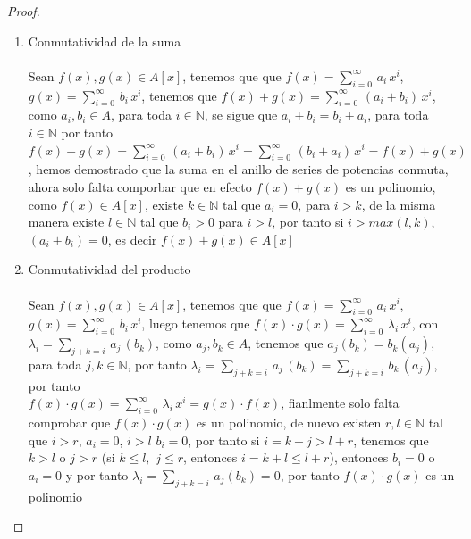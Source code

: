\documentclass[11pt,letterpaper]{article}
\newcommand{\N}{\mathbb{N}}
\begin{document}
\begin{proof}\,\\
    \begin{enumerate}
        \item Conmutatividad de la suma\,\\
        \,\\
        Sean $f(x),g(x)\in A[x]$, tenemos que que $f(x)=\sum_{i=0}^{\infty}\,a_i\,x^i$, $g(x)=\sum_{i=0}^{\infty}\,b_i\,x^i$, tenemos que
        $f(x)+g(x)=\sum_{i=0}^{\infty}\,(a_i+b_i)\,x^i$, como $a_i,b_i\in A$, para toda $i\in \N$, se sigue que $a_i+b_i=b_i+a_i$, para toda $i\in \N$
        por tanto $f(x)+g(x)=\sum_{i=0}^{\infty}\,(a_i+b_i)\,x^i=\sum_{i=0}^{\infty}\,(b_i+a_i)\,x^i=f(x)+g(x)$, hemos demostrado que la suma en el anillo de series de potencias
        conmuta, ahora solo falta comporbar que en efecto $f(x)+g(x)$ es un polinomio, como $f(x)\in A[x]$, existe $k\in \N$ tal que
        $a_i=0$, para $i>k$, de la misma manera existe $l\in \N $ tal que $b_i>0$ para $i>l$, por tanto si $i>max(l,k)$, $(a_i+b_i)=0$, es decir $f(x)+g(x)\in A[x]$
        \,\\
        \item Conmutatividad del producto\,\\
        \,\\
        Sean $f(x),g(x)\in A[x]$, tenemos que que $f(x)=\sum_{i=0}^{\infty}\,a_i\,x^i$, $g(x)=\sum_{i=0}^{\infty}\,b_i\,x^i$, luego tenemos que 
        $f(x)\cdot g(x)=\sum_{i=0}^\infty\,\lambda_i\,x^i$, con $\lambda_i=\sum_{j+k=i}\,a_j\,(b_k)$, como $a_j,b_k\in A$, tenemos que $a_j(b_k)=b_k(a_j)$, para toda $j,k\in \N$, 
        por tanto $\lambda_i=\sum_{j+k=i}\,a_j\,(b_k)=\sum_{j+k=i}\,b_k\,(a_j)$, por tanto\\ $f(x)\cdot g(x)=\sum_{i=0}^\infty\,\lambda_i\,x^i=g(x)\cdot f(x)$, fianlmente solo falta comprobar que $f(x)\cdot g(x)$ es un polinomio, de nuevo existen $r,l\in \N$ tal que 
        $i>r$, $a_i=0$, $i>l$ $b_i=0$, por tanto si $i=k+j>l+r$, tenemos que $k>l$ o $j>r$ (si $k\leq l,\,\,j\leq r$, entonces $i=k+l\leq l+r$), entonces $b_i=0$ o $a_i=0$ y por tanto $\lambda_i=\sum_{j+k=i}\,a_j(b_k)=0$, por tanto $f(x)\cdot g(x)$ es un polinomio

    \end{enumerate}
\end{proof}\,\\
\end{document}
